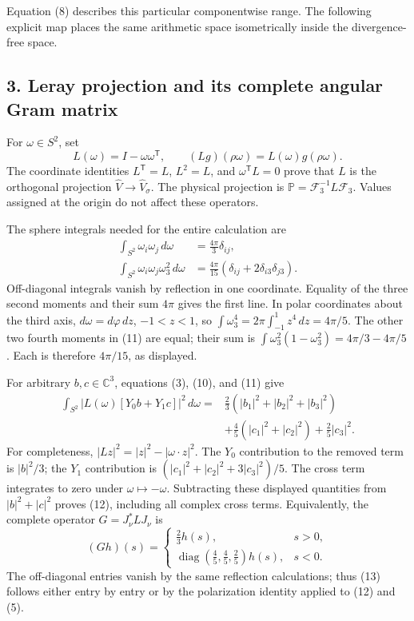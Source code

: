 Equation (8) describes this particular componentwise range. The following explicit map places the same arithmetic space isometrically inside the divergence-free space.

\subsection{3. Leray projection and its complete angular Gram matrix}\label{leray-projection-and-its-complete-angular-gram-matrix}

For \(\omega\in S^2\), set \[
L(\omega)=I-\omega\omega^{\mathsf T},\qquad
(Lg)(\rho\omega)=L(\omega)g(\rho\omega).
\tag{10}
\] The coordinate identities \(L^{\mathsf T}=L\), \(L^2=L\), and \(\omega^{\mathsf T}L=0\) prove that \(L\) is the orthogonal projection \(\widehat V\to\widehat V_\sigma\). The physical projection is \(\mathbb P=\mathcal F_3^{-1}L\mathcal F_3\). Values assigned at the origin do not affect these operators.

The sphere integrals needed for the entire calculation are \[
\begin{aligned}
\int_{S^2}\omega_i\omega_j\,d\omega&=\frac{4\pi}{3}\delta_{ij},\\
\int_{S^2}\omega_i\omega_j\omega_3^2\,d\omega
&=\frac{4\pi}{15}(\delta_{ij}+2\delta_{i3}\delta_{j3}).
\end{aligned}
\tag{11}
\] Off-diagonal integrals vanish by reflection in one coordinate. Equality of the three second moments and their sum \(4\pi\) gives the first line. In polar coordinates about the third axis, \(d\omega=d\varphi\,dz\), \(-1<z<1\), so \(\int\omega_3^4=2\pi\int_{-1}^1z^4\,dz=4\pi/5\). The other two fourth moments in (11) are equal; their sum is \(\int\omega_3^2(1-\omega_3^2)=4\pi/3-4\pi/5\). Each is therefore \(4\pi/15\), as displayed.

For arbitrary \(b,c\in\mathbb C^3\), equations (3), (10), and (11) give \[
\begin{aligned}
\int_{S^2}|L(\omega)[Y_0b+Y_1c]|^2\,d\omega
={}&\frac23(|b_1|^2+|b_2|^2+|b_3|^2)\\
&+\frac45(|c_1|^2+|c_2|^2)+\frac25|c_3|^2.
\end{aligned}
\tag{12}
\] For completeness, \(|Lz|^2=|z|^2-|\omega\cdot z|^2\). The \(Y_0\) contribution to the removed term is \(|b|^2/3\); the \(Y_1\) contribution is \((|c_1|^2+|c_2|^2+3|c_3|^2)/5\). The cross term integrates to zero under \(\omega\mapsto-\omega\). Subtracting these displayed quantities from \(|b|^2+|c|^2\) proves (12), including all complex cross terms. Equivalently, the complete operator \(G=J_\nu^*LJ_\nu\) is \[
(Gh)(s)=
\begin{cases}
\frac23 h(s),&s>0,\\
\operatorname{diag}(\frac45,\frac45,\frac25)h(s),&s<0.
\end{cases}
\tag{13}
\] The off-diagonal entries vanish by the same reflection calculations; thus (13) follows either entry by entry or by the polarization identity applied to (12) and (5).

